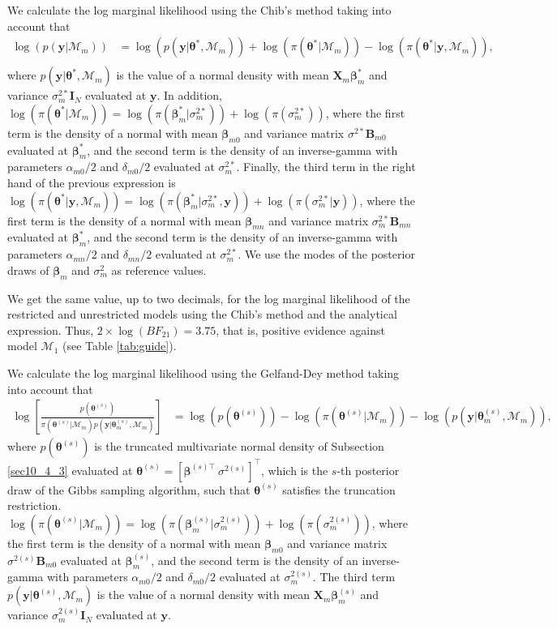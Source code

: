 We calculate the log marginal likelihood using the Chib's method taking into account that 
\begin{align*}
	\log(p(\bm{y}|\mathcal{M}_m))&=\log(p(\bm{y}|\bm{\theta}^*,\mathcal{M}_m))+\log(\pi(\bm{\theta}^*|\mathcal{M}_m))-\log(\pi(\bm{\theta}^*|\bm{y},\mathcal{M}_m)),\\
\end{align*}
where $p(\bm{y}|\bm{\theta}^*,\mathcal{M}_m)$ is the value of a normal density with mean $\bm{X}_m\bm{\beta}_{m}^*$ and variance $\sigma^{2*}_m\bm{I}_N$ evaluated at $\bm{y}$. In addition, $\log(\pi(\bm{\theta}^*|\mathcal{M}_m))=\log(\pi(\bm{\beta}_m^*|\sigma^{2*}_m))+\log(\pi(\sigma^{2*}_m))$, where the first term is the density of a normal with mean $\bm{\beta}_{m0}$ and variance matrix $\sigma^{2*}\bm{B}_{m0}$ evaluated at $\bm{\beta}_m^*$, and the second term is the density of an inverse-gamma with parameters $\alpha_{m0}/2$ and $\delta_{m0}/2$ evaluated at $\sigma^{2*}_m$. Finally, the third term in the right hand of the previous expression is $\log(\pi(\bm{\theta}^*|\bm{y},\mathcal{M}_m))=\log(\pi(\bm{\beta}_m^*|\sigma^{2*}_m,\bm{y}))+\log(\pi(\sigma^{2*}_m|\bm{y}))$, where the first term is the density of a normal with mean $\bm{\beta}_{mn}$ and variance matrix $\sigma^{2*}_m\bm{B}_{mn}$ evaluated at $\bm{\beta}_m^*$, and the second term is the density of an inverse-gamma with parameters $\alpha_{mn}/2$ and $\delta_{mn}/2$ evaluated at $\sigma^{2*}_m$. We use the modes of the posterior draws of $\bm{\beta}_m$ and $\sigma^2_m$ as reference values. 

We get the same value, up to two decimals, for the log marginal likelihood of the restricted and unrestricted models using the Chib's method and the analytical expression. Thus, $2\times\log(BF_{21})=3.75$, that is, positive evidence against model $\mathcal{M}_1$ (see Table \ref{tab:guide}).

We calculate the log marginal likelihood using the Gelfand-Dey method taking into account that
\begin{align*}
	\log\left[\frac{p(\bm{\theta}^{(s)})}{\pi(\bm{\theta}^{(s)}|\mathcal{M}_m)p(\bm{y}|\bm{\theta}^{(s)}_m,\mathcal{M}_m)}\right]&=\log(p(\bm{\theta}^{(s)}))-\log(\pi(\bm{\theta}^{(s)}|\mathcal{M}_m))-\log(p(\bm{y}|\bm{\theta}^{(s)}_m,\mathcal{M}_m)),
\end{align*}
where $p(\bm{\theta}^{(s)})$ is the truncated multivariate normal density of Subsection \ref{sec10_4_3} evaluated at $\bm{\theta}^{(s)}=[\bm{\beta}^{(s)\top} \ \sigma^{2(s)}]^{\top}$, which is the $s$-th posterior draw of the Gibbs sampling algorithm, such that $\bm{\theta}^{(s)}$ satisfies the truncation restriction. $\log(\pi(\bm{\theta}^{(s)}|\mathcal{M}_m))=\log(\pi(\bm{\beta}_m^{(s)}|\sigma^{2(s)}_m))+\log(\pi(\sigma^{2(s)}_m))$, where the first term is the density of a normal with mean $\bm{\beta}_{m0}$ and variance matrix $\sigma^{2(s)}\bm{B}_{m0}$ evaluated at $\bm{\beta}_m^{(s)}$, and the second term is the density of an inverse-gamma with parameters $\alpha_{m0}/2$ and $\delta_{m0}/2$ evaluated at $\sigma^{2(s)}_m$. The third term $p(\bm{y}|\bm{\theta}^{(s)},\mathcal{M}_m)$ is the value of a normal density with mean $\bm{X}_m\bm{\beta}_{m}^{(s)}$ and variance $\sigma^{2(s)}_m\bm{I}_N$ evaluated at $\bm{y}$.

